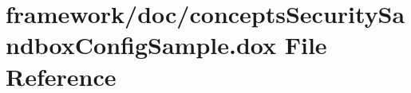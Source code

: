 \hypertarget{concepts_security_sandbox_config_sample_8dox}{}\section{framework/doc/concepts\+Security\+Sandbox\+Config\+Sample.dox File Reference}
\label{concepts_security_sandbox_config_sample_8dox}
